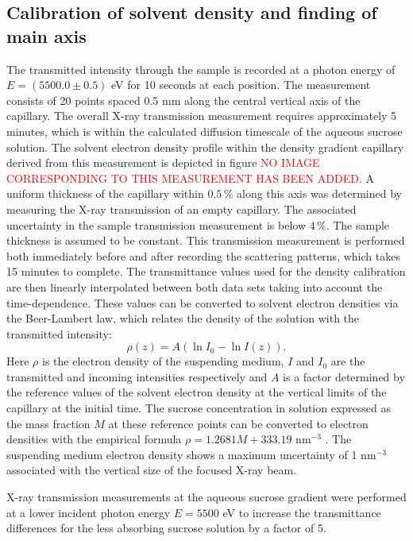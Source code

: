 \subsection{Calibration of solvent density and finding of main axis}
The transmitted intensity through the sample is recorded at a photon energy of \(E = (5500.0 \pm  0.5)\) eV for 10 seconds at each position. The measurement consists of 20 points spaced 0.5 mm along the central vertical axis of the capillary. The overall X-ray transmission measurement requires approximately 5 minutes, which is within the calculated diffusion timescale of the aqueous sucrose solution. The solvent electron density profile within the density gradient capillary derived from this measurement is depicted in figure \textcolor{red}{NO IMAGE CORRESPONDING TO THIS MEASUREMENT HAS BEEN ADDED}. A uniform thickness of the capillary within $0.5\,\%$ along this axis was determined by measuring the X-ray transmission of an empty capillary. The associated uncertainty in the sample transmission measurement is below $4\,\%$. The sample thickness is assumed to be constant. This transmission measurement is performed both immediately before and after recording the scattering patterns, which takes 15 minutes to complete. The transmittance values used for the density calibration are then linearly interpolated between both data sets taking into account the time-dependence. These values can be converted to solvent electron densities via the Beer-Lambert law, which relates the density of the solution with the transmitted intensity:
\begin{equation}
  \rho(z) = A \left( \ln{I_0} - \ln{I(z)} \right) .
\end{equation}
Here \(\rho\) is the electron density of the suspending medium, $I$ and $I_0$ are the transmitted and incoming intensities respectively and $A$ is a factor determined by the reference values of the solvent electron density at the vertical limits of the capillary at the initial time. The sucrose concentration in solution expressed as the mass fraction \( M \) at these reference points can be converted to electron densities with the empirical formula \( \rho=1.2681M+333.19 \) nm\(^{-3}\) \citep{haynes_crc_2012}. The suspending medium electron density shows a maximum uncertainty of 1 nm$^{-3}$ associated with the vertical size of the focused X-ray beam.

X-ray transmission measurements at the aqueous sucrose gradient were performed at a lower incident photon energy $E = 5500$ eV to increase the transmittance differences for the less absorbing sucrose solution by a factor of 5.

